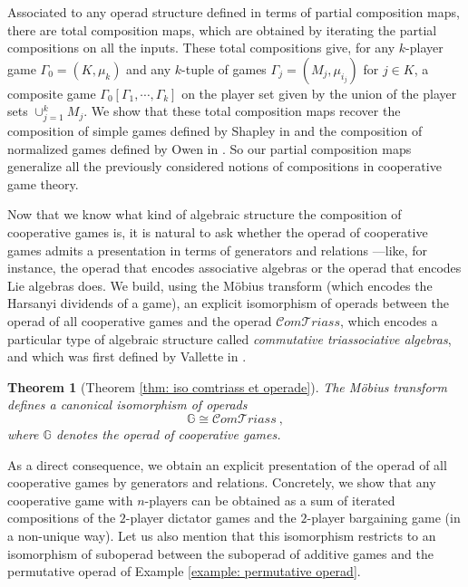 \documentclass[a4paper,12pt]{amsart}
\newtheorem{theoremintro}{Theorem}
\begin{document}
Associated to any operad structure defined in terms of partial composition maps, there are total composition maps, which are obtained by iterating the partial compositions on all the inputs. These total compositions give, for any $k$-player game $\Gamma_0 = (K,\mu_k)$ and any $k$-tuple of games $\Gamma_j = (M_j, \mu_{i_j})$ for $j \in K$, a composite game $\Gamma_0[\Gamma_1,\cdots,\Gamma_k]$ on the player set given by the union of the player sets $\cup_{j = 1}^k M_j$. We show that these total composition maps recover the composition of simple games defined by Shapley in \cite{ShapleyComposition} and the composition of normalized games defined by Owen in \cite{OwenTensor}. So our partial composition maps generalize all the previously considered notions of compositions in cooperative game theory. 

\medskip

Now that we know what kind of algebraic structure the composition of cooperative games is, it is natural to ask whether the operad of cooperative games admits a presentation in terms of generators and relations —like, for instance, the operad that encodes associative algebras or the operad that encodes Lie algebras does. We build, using the Möbius transform (which encodes the Harsanyi dividends of a game), an explicit isomorphism of operads between the operad of all cooperative games and the operad $\mathcal{C}om\mathcal{T}riass$, which encodes a particular type of algebraic structure called \textit{commutative triassociative algebras}, and which was first defined by Vallette in \cite{Vallettepartition}. 

\begin{theoremintro}[Theorem \ref{thm: iso comtriass et operade}]
The Möbius transform defines a canonical isomorphism of operads 
\[
\mathbb{G} \cong \mathcal{C}om\mathcal{T}riass~,
\]
where $\mathbb{G}$ denotes the operad of cooperative games. 
\end{theoremintro}

As a direct consequence, we obtain an explicit presentation of the operad of all cooperative games by generators and relations. Concretely, we show that any cooperative game with $n$-players can be obtained as a sum of iterated compositions of the $2$-player dictator games and the $2$-player bargaining game (in a non-unique way). Let us also mention that this isomorphism restricts to an isomorphism of suboperad between the suboperad of additive games and the permutative operad of Example \ref{example: permutative operad}.
\end{document}
